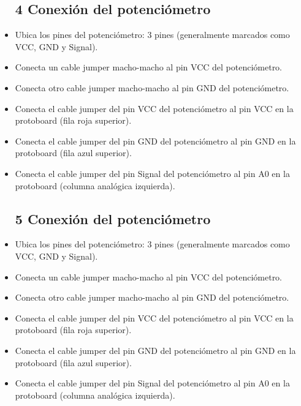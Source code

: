 \begin{itemize}
         \subsection{4 Conexión del potenciómetro }
        \item Ubica los pines del potenciómetro: 3 pines (generalmente marcados como VCC, GND y Signal).
        \item Conecta un cable jumper macho-macho al pin VCC del potenciómetro.
        \item Conecta otro cable jumper macho-macho al pin GND del potenciómetro.
        \item Conecta el cable jumper del pin VCC del potenciómetro al pin VCC en la protoboard (fila roja superior).
        \item Conecta el cable jumper del pin GND del potenciómetro al pin GND en la protoboard (fila azul superior).
         \item Conecta el cable jumper del pin Signal del potenciómetro al pin A0 en la protoboard (columna analógica izquierda).
    
          \subsection{5 Conexión del potenciómetro }
        \item Ubica los pines del potenciómetro: 3 pines (generalmente marcados como VCC, GND y Signal).
        \item Conecta un cable jumper macho-macho al pin VCC del potenciómetro.
        \item Conecta otro cable jumper macho-macho al pin GND del potenciómetro.
        \item Conecta el cable jumper del pin VCC del potenciómetro al pin VCC en la protoboard (fila roja superior).
        \item Conecta el cable jumper del pin GND del potenciómetro al pin GND en la protoboard (fila azul superior).
         \item Conecta el cable jumper del pin Signal del potenciómetro al pin A0 en la protoboard (columna analógica izquierda).
    

\end{itemize}
